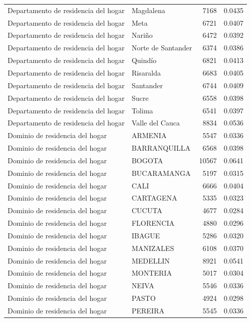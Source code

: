 \begin{table}
\begin{tabular}[t]{llrr}
Departamento de residencia del hogar & Magdalena & 7168 & 0.0435\\
Departamento de residencia del hogar & Meta & 6721 & 0.0407\\
Departamento de residencia del hogar & Nariño & 6472 & 0.0392\\
\addlinespace
Departamento de residencia del hogar & Norte de Santander & 6374 & 0.0386\\
Departamento de residencia del hogar & Quindío & 6821 & 0.0413\\
Departamento de residencia del hogar & Risaralda & 6683 & 0.0405\\
Departamento de residencia del hogar & Santander & 6744 & 0.0409\\
Departamento de residencia del hogar & Sucre & 6558 & 0.0398\\
\addlinespace
Departamento de residencia del hogar & Tolima & 6541 & 0.0397\\
Departamento de residencia del hogar & Valle del Cauca & 8834 & 0.0536\\
Dominio de residencia del hogar & ARMENIA & 5547 & 0.0336\\
Dominio de residencia del hogar & BARRANQUILLA & 6568 & 0.0398\\
Dominio de residencia del hogar & BOGOTA & 10567 & 0.0641\\
\addlinespace
Dominio de residencia del hogar & BUCARAMANGA & 5197 & 0.0315\\
Dominio de residencia del hogar & CALI & 6666 & 0.0404\\
Dominio de residencia del hogar & CARTAGENA & 5335 & 0.0323\\
Dominio de residencia del hogar & CUCUTA & 4677 & 0.0284\\
Dominio de residencia del hogar & FLORENCIA & 4880 & 0.0296\\
\addlinespace
Dominio de residencia del hogar & IBAGUE & 5286 & 0.0320\\
Dominio de residencia del hogar & MANIZALES & 6108 & 0.0370\\
Dominio de residencia del hogar & MEDELLIN & 8921 & 0.0541\\
Dominio de residencia del hogar & MONTERIA & 5017 & 0.0304\\
Dominio de residencia del hogar & NEIVA & 5546 & 0.0336\\
\addlinespace
Dominio de residencia del hogar & PASTO & 4924 & 0.0298\\
Dominio de residencia del hogar & PEREIRA & 5545 & 0.0336\\

\end{tabular}
\end{table}
